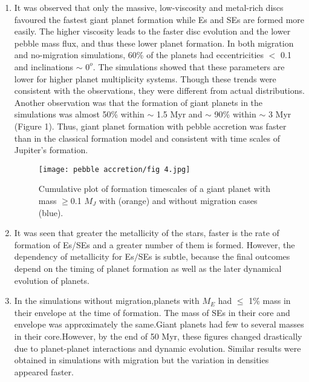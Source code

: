 \begin{enumerate}

\item It was observed that only the massive, low-viscosity and metal-rich discs favoured the fastest giant planet formation while Es and SEs are formed more easily. The higher viscosity leads to the faster disc evolution and the lower pebble mass flux, and thus these lower planet formation. In both migration and no-migration simulations, 60\% of the planets had eccentricities $<$ 0.1 and inclinations $\sim$ $0^o$. The simulations showed that these parameters are lower for higher planet multiplicity systems. Though these trends were consistent with the observations, they were different from actual distributions. Another observation was that the formation of giant planets in the simulations was almost 50\% within $\sim$ 1.5 Myr and $\sim$ 90\% within $\sim$ 3 Myr (Figure 1). Thus, giant planet formation with pebble accretion was faster than in the classical formation model and consistent with time scales of Jupiter’s formation.

\begin{figure}[H] 
\centering
\texttt{[image: pebble accretion/fig 4.jpg]}

\caption{Cumulative plot of formation timescales of a giant planet with mass $\geq$0.1 $M_J$ with (orange) and without migration cases (blue).\cite{refId0}}

\end{figure}

\item It was seen that greater the metallicity of the stars, faster is the rate of formation of Es/SEs and a greater number of them is formed. However, the dependency of metallicity for Es$/$SEs is subtle, because the final outcomes depend on the timing of planet formation as well as the later dynamical evolution of planets.

\item In the simulations without migration,planets with $M_E$ had $\leq$ 1\% mass in their envelope at the time of formation. The mass of SEs in their core and envelope was approximately the same.Giant planets had few to several masses in their core.However, by the end of 50 Myr, these figures changed drastically due to planet-planet interactions and dynamic evolution. Similar results were obtained in simulations with migration but the variation in densities appeared faster.


\end{enumerate}

